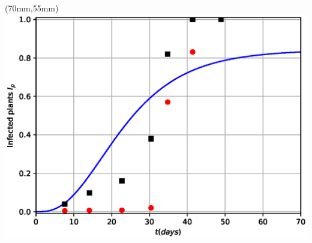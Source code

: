 \documentclass[10pt]{beamer}
\begin{document}
\begin{frame}
	\begin{textblock*}{50mm}(70mm,55mm)
    	\includegraphics[width=\linewidth]{Feathergraphics/Simulation_data.eps}
	\end{textblock*}
\end{frame}
\end{document}
